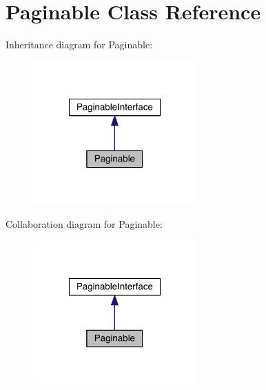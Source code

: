 \hypertarget{classapp_1_1models_1_1core_1_1_pagination_1_1_paginable}{\section{Paginable Class Reference}
\label{classapp_1_1models_1_1core_1_1_pagination_1_1_paginable}
}


Inheritance diagram for Paginable\-:
\nopagebreak
\begin{figure}[H]
\begin{center}
\leavevmode
\includegraphics[width=178pt]{classapp_1_1models_1_1core_1_1_pagination_1_1_paginable__inherit__graph}
\end{center}
\end{figure}


Collaboration diagram for Paginable\-:
\nopagebreak
\begin{figure}[H]
\begin{center}
\leavevmode
\includegraphics[width=178pt]{classapp_1_1models_1_1core_1_1_pagination_1_1_paginable__coll__graph}
\end{center}
\end{figure}
